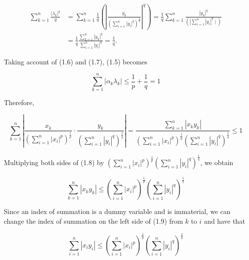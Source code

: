 \documentclass{article}
\begin{document}
\begin{equation}\tag{1.7}
\begin{aligned}
\sum_{k=1}^{n} \frac{\left|\lambda_{k}\right|^{q}}{q} & =\sum_{k=1}^{n} \frac{1}{q}\left(\left|\frac{y_{k}}{\left(\sum_{i=1}^{n}\left|y_{i}\right|^{q}\right)^{\frac{1}{q}}}\right|^{q}\right)=\frac{1}{q} \sum_{k=1}^{n} \frac{\left|y_{k}\right|^{q}}{\left(\left.\left|\sum_{i=1}^{n}\right| y_{i}\right|^{q} \mid\right)} \\
& =\frac{1}{q} \frac{\sum_{k=1}^{n}\left|y_{k}\right|^{q}}{\sum_{i=1}^{n}\left|y_{i}\right|^{q}}=\frac{1}{q} .
\end{aligned}
\end{equation}

Taking account of (1.6) and (1.7), (1.5) becomes

$$
\sum_{k=1}^{n}\left|\alpha_{k} \lambda_{k}\right| \leq \frac{1}{p}+\frac{1}{q}=1
$$

Therefore,

\begin{equation}\tag{1.8}
\sum_{k=1}^{n}\left|\frac{x_{k}}{\left(\sum_{i=1}^{n}\left|x_{i}\right|^{p}\right)^{\frac{1}{p}}} \cdot \frac{y_{k}}{\left(\sum_{i=1}^{n}\left|y_{i}\right|^{q}\right)^{\frac{1}{q}}}\right|=\frac{\sum_{k=1}^{n}\left|x_{k} y_{k}\right|}{\left(\sum_{i=1}^{n}\left|x_{i}\right|^{p}\right)^{\frac{1}{p}}\left(\sum_{i=1}^{n}\left|y_{i}\right|^{q}\right)^{\frac{1}{q}}} \leq 1
\end{equation}

Multiplying both sides of (1.8) by $\left(\sum_{i=1}^{n}\left|x_{i}\right|^{p}\right)^{\frac{1}{p}}\left(\sum_{i=1}^{n}\left|y_{i}\right|^{q}\right)^{\frac{1}{q}}$, we obtain

\begin{equation}\tag{1.9}
\sum_{k=1}^{n}\left|x_{k} y_{k}\right| \leq\left(\sum_{i=1}^{n}\left|x_{i}\right|^{p}\right)^{\frac{1}{p}}\left(\sum_{i=1}^{n}\left|y_{i}\right|^{q}\right)^{\frac{1}{q}}
\end{equation}

Since an index of summation is a dummy variable and is immaterial, we can change the index of summation on the left side of (1.9) from $k$ to $i$ and have that

\begin{equation}\tag{1.10}
\sum_{i=1}^{n}\left|x_{i} y_{i}\right| \leq\left(\sum_{i=1}^{n}\left|x_{i}\right|^{p}\right)^{\frac{1}{p}}\left(\sum_{i=1}^{n}\left|y_{i}\right|^{q}\right)^{\frac{1}{q}}
\end{equation}
\end{document}
